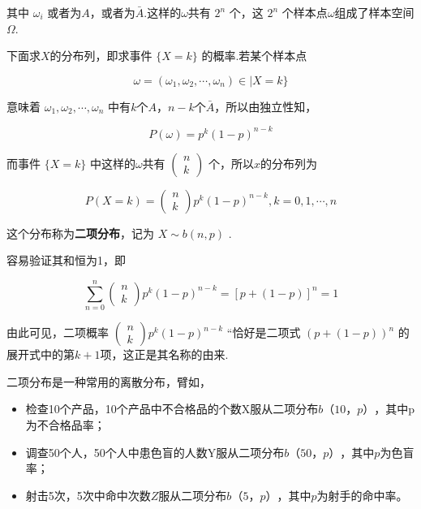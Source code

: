 其中 $\omega_{i}$ 或者为$ A $，或者为$ \bar{A} $.这样的$ \omega $共有 $2^{n}$ 个，这 $2^{n}$ 个样本点$ \omega $组成了样本空间$ \Omega $.

下面求$ X $的分布列，即求事件 $\{X=k\}$ 的概率.若某个样本点

\[
\omega=\left(\omega_{1}, \omega_{2}, \cdots, \omega_{n}\right) \in | X=k \}
\]

意味着 $\omega_{1}, \omega_{2}, \cdots, \omega_{n}$ 中有$ k $个$ A $，$ n-k $个$ \bar{A} $，所以由独立性知，

\[
P(\omega)=p^{k}(1-p)^{n-k}
\]

而事件 $\{X=k\}$ 中这样的$ \omega $共有 $\left( \begin{array}{l}{n} \\ {k}\end{array}\right)$ 个，所以$ x $的分布列为

\begin{equation}
P(X=k)=\left( \begin{array}{l}{n} \\ {k}\end{array}\right) p^{k}(1-p)^{n-k}, k=0,1, \cdots, n \label{eq:2.4.1}
\end{equation}


这个分布称为\textbf{二项分布}，记为 $X \sim b(n, p)$ .

容易验证其和恒为1，即

\[
\sum_{n=0}^{n} \left( \begin{array}{l}{n} \\ {k}\end{array}\right) p^{k}(1-p)^{n-k}=[p+(1-p)]^{n}=1
\]

由此可见，二项概率 $\left( \begin{array}{l}{n} \\ {k}\end{array}\right) p^{k}(1-p)^{n-k}$ “恰好是二项式 $(p+(1-p))^{n}$ 的展开式中的第$ k+1 $项，这正是其名称的由来.

二项分布是一种常用的离散分布，臂如，

\begin{itemize}
	\item 检查10个产品，10个产品中不合格品的个数X服从二项分布$ b（10，p） $，其中p为不合格品率；
	\item 调查50个人，50个人中患色盲的人数Y服从二项分布$ b（50，p） $，其中$ p $为色盲率；
	\item 射击5次，5次中命中次数$ Z $服从二项分布$ b（5，p） $，其中$ p $为射手的命中率。
\end{itemize}

